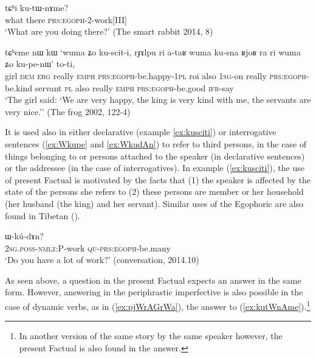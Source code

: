 \documentclass[oldfontcommands,oneside,a4paper,11pt]{article}
\newcommand{\ipa}[1]{{\phon \mbox{#1}}} %
\newcommand{\refb}[1]{(\ref{#1})}
\begin{document}
\begin{exe}
\ex \label{ex:kutWnAme}
\gll \ipa{nɯtɕu}  \ipa{tɕʰi} \ipa{ku-tɯ-nɤme?}\\
what there \textsc{prs:egoph}-2-work[III] \\
\glt `What are you doing there?' (The smart rabbit 2014, 8)
\end{exe}
 
 
\begin{exe}
\ex \label{ex:kusciti}
\gll
\ipa{tɕʰeme} 	\ipa{nɯ} 	\ipa{kɯ} 	\ipa{`wuma} 	\ipa{ʑo} 	\ipa{ku-scit-i,} \ipa{rɟɤlpu} 	\ipa{ri} 	\ipa{a-taʁ} 	\ipa{wuma} 	\ipa{ku-sna} \ipa{ʁjoʁ} 	\ipa{ra} 	\ipa{ri} 	\ipa{wuma} 	\ipa{ʑo} 	\ipa{ku-pe-nɯ'} \ipa{to-ti,} \\
girl \textsc{dem} \textsc{erg} really \textsc{emph} \textsc{prs:egoph}-be.happy-\textsc{1pl}  roi also \textsc{1sg}-on really \textsc{prs:egoph}-be.kind servant \textsc{pl} also really \textsc{emph}   \textsc{prs:egoph}-be.good \textsc{ifr}-say \\
\glt `The girl said: `We are very happy, the king is very kind with me, the servants are very nice.''
(The frog 2002, 122-4)
\end{exe}

It is used also in either declarative (example \ref{ex:kusciti}) or  interrogative sentences (\ref{ex:Wkupe} and \ref{ex:WkudAn}) to refer to third persons, in the case of things belonging to or persons attached to the speaker (in declarative sentences) or the addressee (in the case of interrogatives). In example \refb{ex:kusciti}, the use of present Factual is motivated by the facts that (1) the speaker is affected by the state of the persons she refers to (2) these persons are member or her household (her husband (the king) and her servant). Similar uses of the Egophoric are also found in Tibetan (\citealt[297]{tournadre08conjunct}).

 
  \begin{exe}
\ex \label{ex:WkudAn}
\gll \ipa{nɤ-kɤ-nɤma} 	\ipa{ɯ-kú-dɤn?}  \\
 \textsc{2sg.poss-nmlz:P}-work \textsc{qu-prs:egoph}-be.many \\
\glt `Do you have a lot of work?' (conversation, 2014.10)
\end{exe}

As seen above, a question in the present Factual expects an answer in the same form. However, answering in the periphrastic imperfective is also possible in the case of dynamic verbs, as in \refb{ex:pjWrAGrWa}, the answer to \refb{ex:kutWnAme}.\footnote{In another version of the same story by the same speaker however, the present Factual is also found in the answer.}
\end{document}
